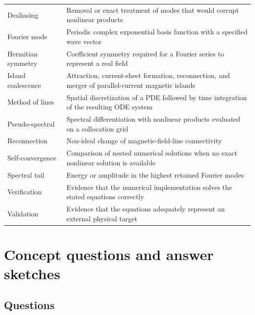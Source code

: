 \documentclass[11pt]{article}
\begin{document}
\begin{longtable}{p{}p{}}
Dealiasing & Removal or exact treatment of modes that would corrupt nonlinear products \\
Fourier mode & Periodic complex exponential basis function with a specified wave vector \\
Hermitian symmetry & Coefficient symmetry required for a Fourier series to represent a real field \\
Island coalescence & Attraction, current-sheet formation, reconnection, and merger of parallel-current magnetic islands \\
Method of lines & Spatial discretization of a PDE followed by time integration of the resulting ODE system \\
Pseudo-spectral & Spectral differentiation with nonlinear products evaluated on a collocation grid \\
Reconnection & Non-ideal change of magnetic-field-line connectivity \\
Self-convergence & Comparison of nested numerical solutions when no exact nonlinear solution is available \\
Spectral tail & Energy or amplitude in the highest retained Fourier modes \\
Verification & Evidence that the numerical implementation solves the stated equations correctly \\
Validation & Evidence that the equations adequately represent an external physical target \\
\bottomrule
\end{longtable}

\section{Concept questions and answer sketches}
\label{app:questions}

\subsection*{Questions}
\end{document}
